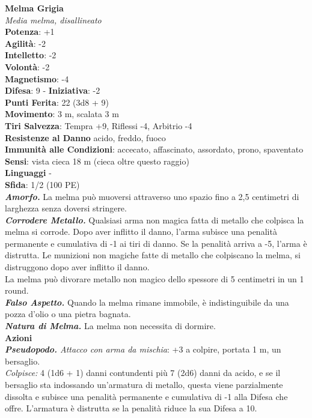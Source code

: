\begin{multicols}{2}
\medskip\textbf{Melma Grigia}\\
\emph{Media melma, disallineato}\\
\textbf{Potenza}: +1\\
\textbf{Agilità}: -2\\
\textbf{Intelletto}: -2\\
\textbf{Volontà}: -2\\
\textbf{Magnetismo}: -4\\
\textbf{Difesa}: 9 - \textbf{Iniziativa}: -2\\
\textbf{Punti Ferita}: 22 (3d8 + 9)\\
\textbf{Movimento}: 3 m, scalata 3 m\\
\textbf{Tiri Salvezza}: Tempra +9, Riflessi -4, Arbitrio -4\\
\textbf{Resistenze al Danno} acido, freddo, fuoco\\
\textbf{Immunità alle Condizioni}: accecato, affascinato, assordato, prono, spaventato
\textbf{Sensi}: vista cieca 18 m (cieca oltre questo raggio)\\
\textbf{Linguaggi} -\\
\textbf{Sfida}: 1/2 (100 PE)\smallskip\\
\emph{\textbf{Amorfo.}} La melma può muoversi attraverso uno spazio fino a 2,5 centimetri di larghezza senza doversi stringere.\\
\emph{\textbf{Corrodere Metallo.}} Qualsiasi arma non magica fatta di metallo che colpisca la melma si corrode. Dopo aver inflitto il danno, l'arma subisce una penalità permanente e cumulativa di -1 ai tiri di danno. Se la penalità arriva a -5, l'arma è distrutta. Le munizioni non magiche fatte di metallo che colpiscano la melma, si distruggono dopo aver inflitto il danno.\\
La melma può divorare metallo non magico dello spessore di 5 centimetri in un 1 round.\\
\emph{\textbf{Falso Aspetto.}} Quando la melma rimane immobile, è indistinguibile da una pozza d'olio o una pietra bagnata.\\
\emph{\textbf{Natura di Melma.}} La melma non necessita di dormire. \\
\smallskip\textbf{Azioni}\\
\emph{\textbf{Pseudopodo.} Attacco con arma da mischia}: +3 a colpire, portata 1 m, un bersaglio.\\
\emph{Colpisce:} 4 (1d6 + 1) danni contundenti più 7 (2d6) danni da acido, e se il bersaglio sta indossando un'armatura di metallo, questa viene parzialmente dissolta e subisce una penalità permanente e cumulativa di -1 alla Difesa che offre. L'armatura è distrutta se la penalità riduce la sua Difesa a 10.\\

\end{multicols}
